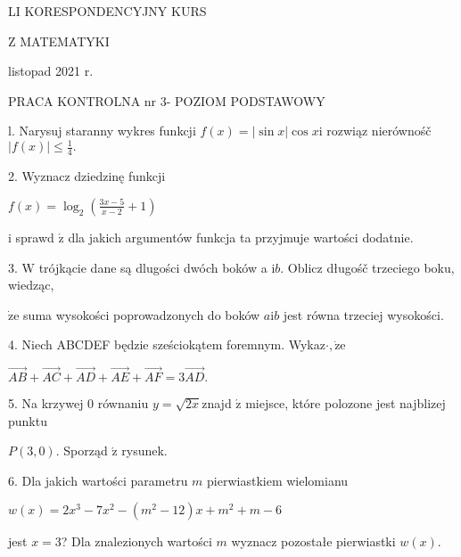 \documentclass[a4paper,12pt]{article}
\begin{document}
LI KORESPONDENCYJNY KURS

Z MATEMATYKI

listopad 2021 r.

PRACA KONTROLNA nr $3$- POZIOM PODSTAWOWY

l. Narysuj staranny wykres funkcji $f(x)=|\sin x|\cos x\mathrm{i}$ rozwiąz nierównośč $|f(x)|\displaystyle \leq\frac{1}{4}.$

2. Wyznacz dziedzinę funkcji

$f(x)=\displaystyle \log_{2}(\frac{3x-5}{x-2}+1)$

$\mathrm{i}$ sprawd $\acute{\mathrm{z}}$ dla jakich argumentów funkcja ta przyjmuje wartości dodatnie.

3. $\mathrm{W}$ trójkącie dane są dlugości dwóch boków a $\mathrm{i}b$. Oblicz długośč trzeciego boku, wiedząc,

$\dot{\mathrm{z}}\mathrm{e}$ suma wysokości poprowadzonych do boków $a\mathrm{i}b$ jest równa trzeciej wysokości.

4. Niech ABCDEF będzie sześciokątem foremnym. Wykaz$\cdot, \dot{\mathrm{z}}\mathrm{e}$

$\vec{AB}+\vec{AC}+\vec{AD}+\vec{AE}+\vec{AF}=3\vec{AD}.$

5. Na krzywej $0$ równaniu $y= \sqrt{2x}$znajd $\acute{\mathrm{z}}$ miejsce, które polozone jest najblizej punktu

$P(3,0).$ Sporząd $\acute{\mathrm{z}}$ rysunek.

6. Dla jakich wartości parametru $m$ pierwiastkiem wielomianu

$w(x)=2x^{3}-7x^{2}-(m^{2}-12)x+m^{2}+m-6$

jest $x=3$? Dla znalezionych wartości $m$ wyznacz pozostałe pierwiastki $w(x).$
\end{document}
